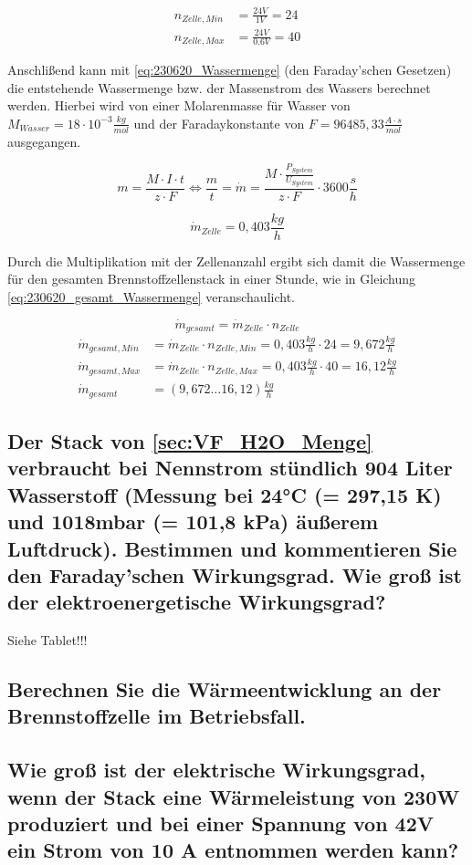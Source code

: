 \begin{align}
    n_{Zelle,Min} &= \frac{24V}{1V} = 24 \nonumber\\
    n_{Zelle,Max} &= \frac{24V}{0.6V} = 40 \nonumber
\end{align}

Anschlißend kann mit \autoref{eq:230620_Wassermenge} (den Faraday'schen Gesetzen) die entstehende Wassermenge bzw. der Massenstrom des Wassers berechnet werden.
Hierbei wird von einer Molarenmasse für Wasser von $M_{Wasser} = 18 \cdot 10^{-3} \frac{kg}{mol}$ und der Faradaykonstante von $F =96485,33 \frac{A\cdot s}{mol}$ ausgegangen.

\begin{equation}
    m = \frac{M \cdot I \cdot t}{z \cdot F} \Leftrightarrow \frac{m}{t} = \dot{m} = \frac{M \cdot \frac{P_{System}}{U_{System}}}{z \cdot F} \cdot 3600 \frac{s}{h}
    \label{eq:230620_Wassermenge}
\end{equation}

$$\dot{m}_{Zelle} = 0,403 \frac{kg}{h}$$

Durch die Multiplikation mit der Zellenanzahl ergibt sich damit die Wassermenge für den gesamten Brennstoffzellenstack in einer Stunde, wie in Gleichung \autoref{eq:230620_gesamt_Wassermenge} veranschaulicht.

\begin{equation}
    \dot{m}_{gesamt} = \dot{m}_{Zelle} \cdot n_{Zelle}
    \label{eq:230620_gesamt_Wassermenge}
\end{equation}
\begin{align}
    \dot{m}_{gesamt,Min} &= \dot{m}_{Zelle} \cdot n_{Zelle,Min} = 0,403 \frac{kg}{h} \cdot 24 = 9,672 \frac{kg}{h} \nonumber\\
    \dot{m}_{gesamt,Max} &= \dot{m}_{Zelle} \cdot n_{Zelle,Max} = 0,403 \frac{kg}{h} \cdot 40 = 16,12 \frac{kg}{h} \nonumber\\
    \dot{m}_{gesamt} &= (9,672 \dots 16,12) \frac{kg}{h} \nonumber
\end{align}

\subsection{Der Stack von \ref{sec:VF_H2O_Menge} verbraucht bei Nennstrom stündlich 904 Liter Wasserstoff (Messung bei 24°C (= 297,15 K) und 1018mbar (= 101,8 kPa) äußerem Luftdruck). 
Bestimmen und kommentieren Sie den Faraday'schen Wirkungsgrad. Wie groß ist der elektroenergetische Wirkungsgrad?}

Siehe Tablet!!!

\subsection{Berechnen Sie die Wärmeentwicklung an der Brennstoffzelle im Betriebsfall.}
\subsection{Wie groß ist der elektrische Wirkungsgrad, wenn der Stack eine Wärmeleistung von
230W produziert und bei einer Spannung von 42V ein Strom von 10 A entnommen werden kann?}
